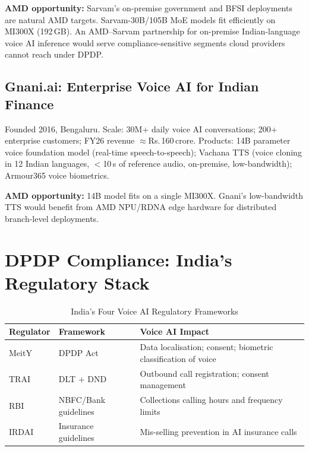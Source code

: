 \documentclass[12pt,a4paper]{article}
\begin{document}
\textbf{AMD opportunity:} Sarvam's on-premise government and BFSI
deployments are natural AMD targets.  Sarvam-30B/105B MoE models fit
efficiently on MI300X (192\,GB).  An AMD--Sarvam partnership for on-premise
Indian-language voice AI inference would serve compliance-sensitive segments
cloud providers cannot reach under DPDP.

\subsection{Gnani.ai: Enterprise Voice AI for Indian Finance}

Founded 2016, Bengaluru.  Scale: 30M+ daily voice AI conversations; 200+
enterprise customers; FY26 revenue $\approx$Rs.\,160\,crore.  Products: 14B
parameter voice foundation model (real-time speech-to-speech); Vachana TTS
(voice cloning in 12 Indian languages, $<$10\,s of reference audio,
on-premise, low-bandwidth); Armour365\texttrademark{} voice biometrics.

\textbf{AMD opportunity:} 14B model fits on a single MI300X.
Gnani's low-bandwidth TTS would benefit from AMD NPU/RDNA edge hardware
for distributed branch-level deployments.

\section{DPDP Compliance: India's Regulatory Stack}
\label{sec:dpdp}

\begin{table}[H]\centering
\caption{India's Four Voice AI Regulatory Frameworks}
\label{tab:dpdp-regulators}
\begin{tabularx}{\textwidth}{llX}
\toprule
\textbf{Regulator} & \textbf{Framework} & \textbf{Voice AI Impact} \\
\midrule
MeitY & DPDP Act            & Data localisation; consent; biometric classification of voice \\
TRAI  & DLT + DND           & Outbound call registration; consent management \\
RBI   & NBFC/Bank guidelines& Collections calling hours and frequency limits \\
IRDAI & Insurance guidelines & Mis-selling prevention in AI insurance calls \\
\bottomrule
\end{tabularx}
\end{table}
\end{document}
